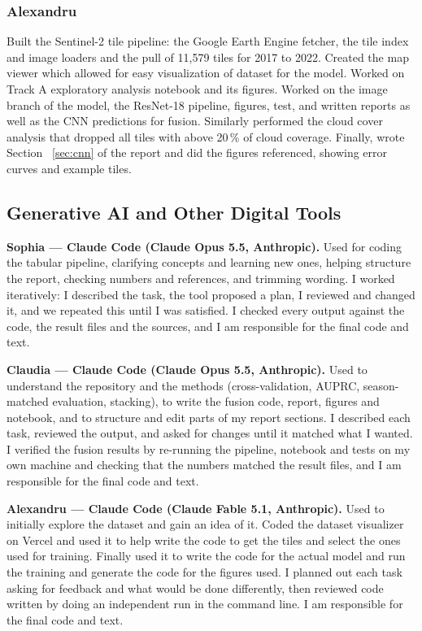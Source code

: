 \subsubsection*{Alexandru}
Built the Sentinel-2 tile pipeline: the Google Earth Engine fetcher, the tile index and image loaders and the pull of 11,579 tiles for 2017 to 2022. Created the map viewer which allowed for easy visualization of dataset for the model. Worked on Track A exploratory analysis notebook and its figures. Worked on the image branch of the model, the ResNet-18 pipeline, figures, test, and written reports as well as the CNN predictions for fusion. Similarly performed the cloud cover analysis that dropped all tiles with above 20\,\% of cloud coverage. Finally, wrote Section ~\ref{sec:cnn} of the report and did the figures referenced, showing error curves and example tiles.


\subsection*{Generative AI and Other Digital Tools}
\textbf{Sophia --- Claude Code (Claude Opus 5.5, Anthropic).} Used for coding the tabular pipeline, clarifying concepts and learning new ones, helping structure the report, checking numbers and references, and trimming wording. I worked iteratively: I described the task, the tool proposed a plan, I reviewed and changed it, and we repeated this until I was satisfied. I checked every output against the code, the result files and the sources, and I am responsible for the final code and text. 

\textbf{Claudia --- Claude Code (Claude Opus 5.5, Anthropic).} Used to understand the repository and the methods (cross-validation, AUPRC, season-matched evaluation, stacking), to write the fusion code, report, figures and notebook, and to structure and edit parts of my report sections. I described each task, reviewed the output, and asked for changes until it matched what I wanted. I verified the fusion results by re-running the pipeline, notebook and tests on my own machine and checking that the numbers matched the result files, and I am responsible for the final code and text.

\textbf{Alexandru --- Claude Code (Claude Fable 5.1, Anthropic).} Used to initially explore the dataset and gain an idea of it. Coded the dataset visualizer on Vercel and used it to help write the code to get the tiles and select the ones used for training. Finally used it to write the code for the actual model and run the training and generate the code for the figures used. I planned out each task asking for feedback and what would be done differently, then reviewed code written by doing an independent run in the command line. I am responsible for the final code and text. 